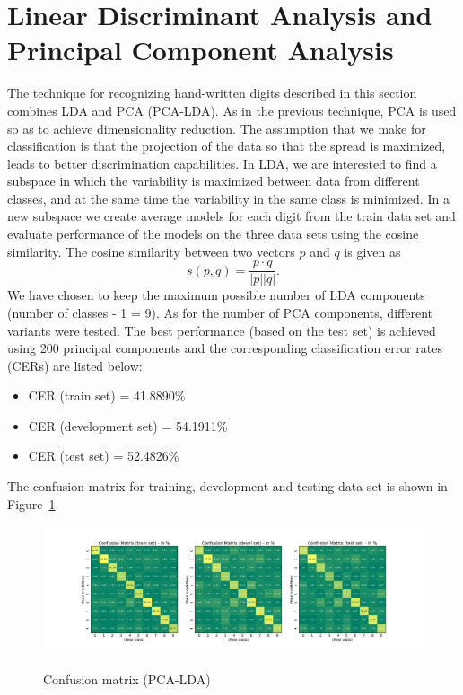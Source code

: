\documentclass[a4paper,10pt,fleqn]{article}
\begin{document}
\section{Linear Discriminant Analysis and Principal Component Analysis}\label{sec:pca_lda}

The technique for recognizing hand-written digits described in this section combines LDA and PCA (PCA-LDA). As in the previous technique, PCA is used so as to achieve dimensionality reduction.
The assumption that we make for classification is that the projection of the data so that the spread is maximized, leads to  better discrimination capabilities.
In LDA, we are interested to find a subspace in which the variability is maximized between data from
different classes, and at the same time the variability in the same class is minimized. 
In a new subspace we create average models for each digit from the train data set and evaluate performance of the models on the three data sets using the cosine similarity. The cosine similarity between two vectors $p$ and $q$ is given  as
\begin{equation}\label{eq:cs}
s(p,q)=\frac{p\cdot q}{|p||q|}.
\end{equation}
We have chosen to keep the maximum possible number of LDA components (number of classes - 1 = 9).
As for the number of PCA components, different variants were tested. The best performance (based on the test set) is achieved using 200 principal components and the corresponding classification error rates (CERs)  are listed below:
\begin{itemize}
\item CER (train set) = 41.8890\%
\item CER (development set) = 54.1911\%
\item CER (test set) = 52.4826\%
\end{itemize}
The confusion matrix for training, development and testing data set is shown in Figure~\ref{fig:pca_lda}.
\begin{figure}[htbf]
  \caption{Confusion matrix (PCA-LDA)}
  \centering \includegraphics[width=\textwidth,height=0.3\textwidth]{Figures/pca200_lda9}
  \label{fig:pca_lda}
\end{figure}
\end{document}
